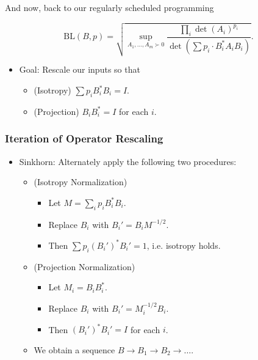 \documentclass[handout,usenames,dvipsnames,12pt]{beamer}
\begin{document}
\begin{frame}

And now, back to our regularly scheduled programming

\[ \text{BL}(B,p) = \sqrt{ \sup_{A_1,\dots,A_m \succ 0} \frac{\prod_i \det(A_i)^{p_i}}{\det(\sum p_i \cdot B_i^* A_i B_i)}}. \]

\begin{itemize}
    \pause
    \item Goal: Rescale our inputs so that
    \begin{itemize}
        \pause
        \item (Isotropy) $\sum p_i B_i^* B_i = I$.
        
        \pause
        \item (Projection) $B_i B_i^* = I$ for each $i$.
    \end{itemize}

\end{itemize}

\end{frame}


\begin{frame}
    \frametitle{Iteration of Operator Rescaling}

    \begin{itemize}
    \item Sinkhorn: Alternately apply the following two procedures:
    \begin{itemize}
        \pause
        \item (Isotropy Normalization)
        \begin{itemize}
            \pause
            \item Let $M = \sum_i p_i B_i^* B_i$.
            \pause
            \item Replace $B_i$ with $B_i' = B_i M^{-1/2}$.
            \pause
            \item Then $\sum p_i (B_i')^* B_i' = 1$, i.e. isotropy holds.
        \end{itemize}

        \pause
        \item (Projection Normalization)
        \begin{itemize}
            \pause
            \item Let $M_i = B_i B_i^*$.
            
            \pause
            \item Replace $B_i$ with $B_i' = M_i^{-1/2} B_i$.
            
            \pause
            \item Then $(B_i')^* B_i' = I$ for each $i$.
        \end{itemize}

        \pause
        \item We obtain a sequence $B \to B_1 \to B_2 \to \dots$.
    \end{itemize}
\end{itemize}

\end{frame}
\end{document}
